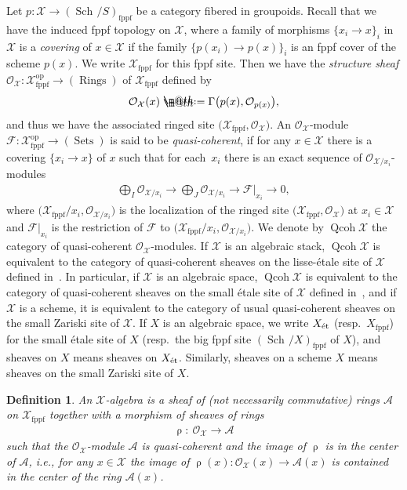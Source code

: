 \documentclass[pdftex]{sigma}%
\makeatletter
\newtheorem{dfn}{Definition}[section]
\newcommand*{\defeq}{\mathrel{\rlap{%
 \raisebox{0.3ex}{$\m@th\cdot$}}%
 \raisebox{-0.3ex}{$\m@th\cdot$}}%
 =}
\numberwithin{equation}{section}
\newcommand{\Qcoh}{\operatorname{Qcoh}}
\newcommand{\Sch}{\operatorname{Sch\!}}
\newcommand{\fppf}{\operatorname{fppf}}
\newcommand{\Rings}{\operatorname{Rings}}
\newcommand{\Sets}{\operatorname{Sets}}
\newcommand{\op}{\operatorname{op}}
\newcommand{\et}{\text{\rm \'et}}
\newcommand{\cA}{\mathcal{A}}
\newcommand{\cF}{\mathcal{F}}
\newcommand{\cO}{\mathcal{O}}
\newcommand{\cX}{\mathcal{X}}
\makeatother
\begin{document}
Let $p\colon \cX\to (\Sch/S)_{\fppf}$ be a category fibered in groupoids. Recall that we have the induced fppf topology on $\cX$, where a family of morphisms $\{x_i\to x\}_{i}$ in $\cX$ is a {\it covering} of $x\in \cX$ if the family $\{ p(x_i)\to p(x)\}_i$ is an fppf cover of the scheme $p(x)$. We write $\cX_{\fppf}$ for this fppf site. Then we have the {\it structure sheaf} $\cO_{\cX}\colon \cX_{\fppf}^{\op}\to (\Rings)$ of $\cX_{\fppf}$ defined by
\begin{gather*}
\cO_{\cX}(x)\defeq\Gamma\big(p(x),\cO_{p(x)}\big),
\end{gather*}
and thus we have the associated ringed site $\big(\cX_{\fppf},\cO_{\cX}\big)$. An $\cO_{\cX}$-module $\cF\colon\cX_{\fppf}^{\op}\to (\Sets)$ is said to be {\it quasi-coherent}, if for any $x\in \cX$ there is a covering $\{x_i\to x\}$ of $x$ such that for each~$x_i$ there is an exact sequence of $\cO_{\cX/x_i}$-modules
\begin{gather*}
\bigoplus_{I}\cO_{\cX/x_i}\to \bigoplus_{J}\cO_{\cX/x_i}\to\cF|_{x_i}\to 0,
\end{gather*}
 where $\big(\cX_{\fppf}/x_i,\cO_{\cX/x_i}\big)$ is the localization of the ringed site $\big(\cX_{\fppf},\cO_{\cX}\big)$ at $x_i\in\cX$ and $\cF|_{x_i}$ is the restriction of $\cF$ to $\big(\cX_{\fppf}/x_i,\cO_{\cX/x_i}\big)$. We denote by $\Qcoh \cX$ the category of quasi-coherent $\cO_{\cX}$-modules. If $\cX$ is an algebraic stack, $\Qcoh \cX$ is equivalent to the category of quasi-coherent sheaves on the lisse-\'etale site of $\cX$ defined in~\cite[Definition 9.1.14]{olsson}. In particular, if $\cX$ is an algebraic space, $\Qcoh \cX$ is equivalent to the category of quasi-coherent sheaves on the small \'etale site of $\cX$ defined in~\cite[Definition 7.1.5]{olsson}, and if $\cX$ is a scheme, it is equivalent to the category of usual quasi-coherent sheaves on the small Zariski site of $\cX$. If $X$ is an algebraic space, we write $X_{\et}$ (resp.\ $X_{\fppf}$) for the small \'etale site of $X$ (resp.\ the big fppf site $(\Sch/X)_{\fppf}$ of $X$), and sheaves on $X$ means sheaves on $X_{\et}$. Similarly, sheaves on a scheme $X$ means sheaves on the small Zariski site of $X$.


 \begin{dfn} An {\it ${\cX}$-algebra} is a sheaf of (not necessarily commutative) rings $\cA$ on $\cX_{\fppf}$ together with a morphism of sheaves of rings
 \begin{gather*}
 \uprho\colon\ \cO_{\cX}\to \cA
 \end{gather*}
 such that the $\cO_{\cX}$-module $\cA$ is quasi-coherent and the image of $\uprho$ is in the center of $\cA$, i.e., for any $x\in \cX$ the image of $\uprho(x)\colon \cO_{\cX}(x)\to \cA(x)$ is contained in the center of the ring $\cA(x)$.
\end{dfn}
\end{document}
